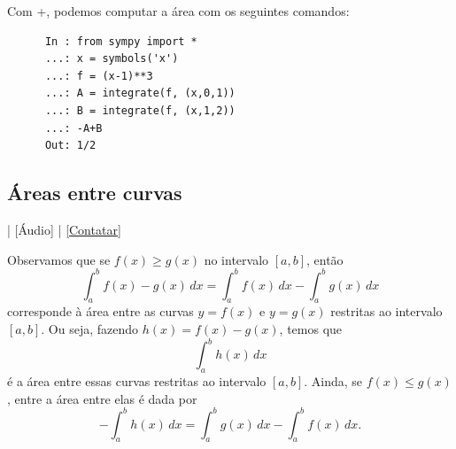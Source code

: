 \begin{ex}
  \ifispython
  Com {\python}+{\sympy}, podemos computar a área com os seguintes comandos:
    \begin{lstlisting}
      In : from sympy import *
      ...: x = symbols('x')
      ...: f = (x-1)**3
      ...: A = integrate(f, (x,0,1))
      ...: B = integrate(f, (x,1,2))
      ...: -A+B
      Out: 1/2
    \end{lstlisting}
    \fi  
\end{ex}

\subsection{Áreas entre curvas}

\begin{flushright}
  [Vídeo] | [Áudio] | \href{https://phkonzen.github.io/notas/contato.html}{[Contatar]}
\end{flushright}

Observamos que se $f(x)\geq g(x)$ no intervalo $[a, b]$, então
\begin{equation}
  \int_a^b f(x)-g(x)\,dx = \int_a^bf(x)\,dx - \int_a^bg(x)\,dx
\end{equation}
corresponde à área entre as curvas $y = f(x)$ e $y = g(x)$ restritas ao intervalo $[a,b]$. Ou seja, fazendo $h(x) = f(x)-g(x)$, temos que
\begin{equation}
  \int_a^bh(x)\,dx
\end{equation}
é a área entre essas curvas restritas ao intervalo $[a, b]$. Ainda, se $f(x)\leq g(x)$, entre a área entre elas é dada por
\begin{equation}
  -\int_a^bh(x)\,dx = \int_a^bg(x)\,dx - \int_a^bf(x)\,dx.
\end{equation}

